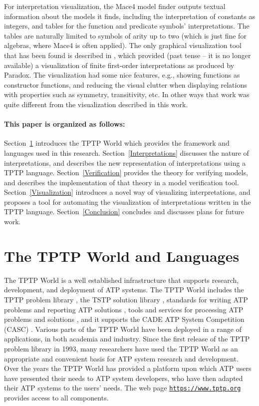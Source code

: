 \documentclass{easychair}
\newcommand{\smalltt}[1]{\small \texttt{#1}}
\begin{document}
For interpretation visualization, the Mace4 model finder \cite{McC03-MACE4-TR} outputs textual 
information about the models it finds, including the interpretation of constants as integers,
and tables for the function and predicate symbols' interpretations. 
The tables are naturally limited to symbols of arity up to two (which is just fine for algebras, 
where Mace4 is often applied).
The only graphical visualization tool that has been found is described in \cite{Sch13-MS},
which provided (past tense -- it is no longer available) a visualization of finite first-order 
interpretations as produced by Paradox.
The visualization had some nice features, e.g., showing functions as constructor functions, and 
reducing the visual clutter when displaying relations with properties such as symmetry, 
transitivity, etc.
In other ways that work was quite different from the visualization described in this work.

\paragraph{This paper is organized as follows:}
Section~\ref{TPTP} introduces the TPTP World which provides the framework and languages used
in this research.
Section~\ref{Interpretations} discusses the nature of interpretations, and describes the new 
representation of interpretations using a TPTP language.
Section~\ref{Verification} provides the theory for verifying models, and describes the
implementation of that theory in a model verification tool.
Section~\ref{Visualization} introduces a novel way of visualizing interpretations, and
proposes a tool for automating the visualization of interpretations written in the TPTP language.
Section~\ref{Conclusion} concludes and discusses plans for future work.

\section{The TPTP World and Languages}
\label{TPTP}

The TPTP World \cite{Sut17} is a well established infrastructure that supports research, 
development, and deployment of ATP systems.
The TPTP World includes the TPTP problem library
\cite{Sut09}, 
the TSTP solution library
\cite{Sut10}, 
standards for writing ATP problems and reporting ATP solutions
\cite{SS+06,Sut08-KEAPPA}, 
tools and services for processing ATP problems and solutions
\cite{Sut10}, 
and it supports the CADE ATP System Competition (CASC)
\cite{Sut16}.
Various parts of the TPTP World have been deployed in a range of applications,
in both academia and industry.
Since the first release of the TPTP problem library in 1993, many researchers have used the 
TPTP World as an appropriate and convenient basis for ATP system research and development. 
Over the years the TPTP World has provided a platform upon which ATP users have presented their 
needs to ATP system developers, who have then adapted their ATP systems to the users’ needs.
The web page {\smalltt{\url{https://www.tptp.org}}} provides access to all components.
\end{document}
